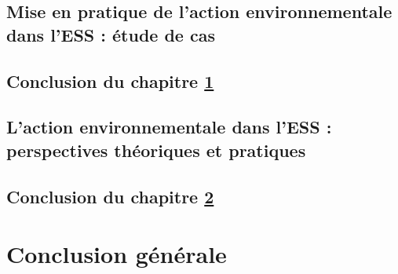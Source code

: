 \documentclass{Classe_Seba}
\begin{document}
            \chapter{Mise en pratique de l'action environnementale dans l'ESS : étude de cas}
                \label{chapitre:casess}
                \minitoc \newpage
                
                
                
            \chapter*{Conclusion du chapitre \ref{chapitre:casess}}
                

            \chapter{L'action environnementale dans l'ESS : perspectives théoriques et pratiques}
                \label{chapitre:discussion}
                \minitoc \newpage
                
                \chapter*{Conclusion du chapitre \ref{chapitre:discussion}}
                    
                    \newpage

            \whitepage
            \part*{Conclusion générale}
                
                \newpage



           
    		\renewcommand{\baselinestretch}{1}		%
    		\DeclareRobustCommand{\disambiguate}[3]{#1}
    		\printbibliography
            \newpage
        \whitepage
        \appendix \makeatletter
        \makeatother
\end{document}
